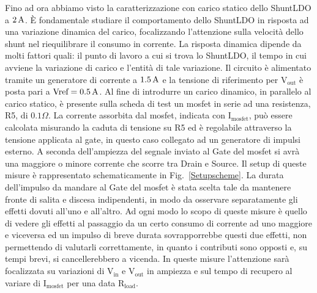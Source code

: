 Fino ad ora abbiamo visto la caratterizzazione con carico statico dello ShuntLDO a $2 \rm \, A$.
\`E fondamentale studiare il comportamento dello ShuntLDO in risposta ad una variazione dinamica del carico, focalizzando l'attenzione sulla velocità dello shunt nel riequilibrare il consumo in corrente. 
La risposta dinamica dipende da molti fattori quali: il punto di lavoro a cui si trova lo ShuntLDO, il tempo in cui avviene la variazione di carico e l'entità di tale variazione. 
Il circuito è alimentato tramite un generatore di corrente a $1.5 \rm \, A$ e la tensione di riferimento per $\mathrm{V_{out}}$ è posta pari a $\mathrm{Vref=0.5 \rm \, A}$.%
Al fine di introdurre un carico dinamico, in parallelo al carico statico, è presente sulla scheda di test un mosfet in serie ad una resistenza, R5, di $0.1 \Omega$.
La corrente assorbita dal mosfet, indicata con $\mathrm{I_{mosfet}}$, può essere calcolata misurando la caduta di tensione su R5 ed è regolabile attraverso la tensione applicata al gate, in questo caso collegato ad un generatore di impulsi esterno.
A seconda dell'ampiezza del segnale inviato al Gate del mosfet si avrà una maggiore o minore corrente che scorre tra Drain e Source. 
Il setup di queste misure è rappresentato schematicamente in Fig.~\ref{Setupscheme}.
La durata dell'impulso da mandare al Gate del mosfet è stata scelta tale da mantenere fronte di salita e discesa indipendenti, in modo da osservare separatamente gli effetti dovuti all'uno e all'altro.
Ad ogni modo lo scopo di queste misure è quello di vedere gli effetti al passaggio da un certo consumo di corrente ad uno maggiore e viceversa ed un impulso di breve durata sovrapporrebbe questi due effetti, non permettendo di valutarli correttamente, in quanto i contributi sono opposti e, su tempi brevi, si cancellerebbero a vicenda.
In queste misure l'attenzione sarà focalizzata su variazioni di $\mathrm{V_{in}}$ e $\mathrm{V_{out}}$ in ampiezza e sul tempo di recupero al variare di $\mathrm{I_{mosfet}}$ per una data $\mathrm{R_{load}}$.

